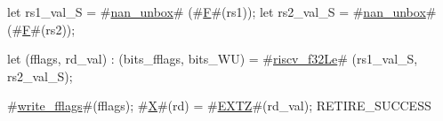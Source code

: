 let rs1_val_S = #\hyperref[sailRISCVznanzyunbox]{nan\_unbox}# (#\hyperref[sailRISCVzF]{F}#(rs1));
let rs2_val_S = #\hyperref[sailRISCVznanzyunbox]{nan\_unbox}# (#\hyperref[sailRISCVzF]{F}#(rs2));

let (fflags, rd_val) : (bits_fflags, bits_WU) =
    #\hyperref[sailRISCVzriscvzyf32Le]{riscv\_f32Le}# (rs1_val_S, rs2_val_S);

#\hyperref[sailRISCVzwritezyfflags]{write\_fflags}#(fflags);
#\hyperref[sailRISCVzX]{X}#(rd) = #\hyperref[sailRISCVzEXTZ]{EXTZ}#(rd_val);
RETIRE_SUCCESS
